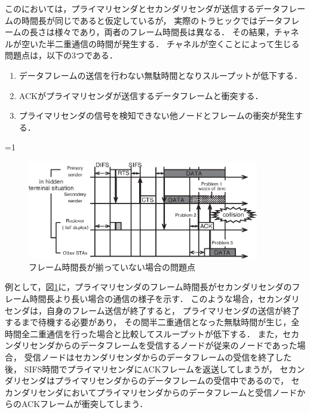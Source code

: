 \documentclass[master]{kuisthesis}		%
\newcounter{flagFig}
\begin{document}
			\par
			この\cite{fdmac}においては，プライマリセンダとセカンダリセンダが送信するデータフレームの時間長が同じであると仮定しているが，
			実際のトラヒックではデータフレームの長さは様々であり，両者のフレーム時間長は異なる．
			その結果，チャネルが空いた半二重通信の時間が発生する．
			チャネルが空くことによって生じる問題点は，以下の3つである．
			\begin{enumerate}
				\item データフレームの送信を行わない無駄時間となりスループットが低下する．
			 	\item ACKがプライマリセンダが送信するデータフレームと衝突する．
			 	\item プライマリセンダの信号を検知できない他ノードとフレームの衝突が発生する．
			\end{enumerate}
			\par
			\ifnum\value{flagFig}=1 {\begin{figure}[htbp]
				\begin{center}
					\includegraphics[width=0.9\textwidth]{fig/relay_not_equal2.eps}
					\caption{フレーム時間長が揃っていない場合の問題点}
					\label{fig:not_equal}
				\end{center}
			\end{figure}}\fi
			例として，図\ref{fig:not_equal}に，プライマリセンダのフレーム時間長がセカンダリセンダのフレーム時間長より長い場合の通信の様子を示す．
			このような場合，セカンダリセンダは，自身のフレーム送信が終了すると，
			プライマリセンダの送信が終了するまで待機する必要があり，
			その間半二重通信となった無駄時間が生じ，全時間全二重通信を行った場合と比較してスループットが低下する．
			また，セカンダリセンダからのデータフレームを受信するノードが従来のノードであった場合，
			受信ノードはセカンダリセンダからのデータフレームの受信を終了した後，
			SIFS時間でプライマリセンダにACKフレームを返送してしまうが，
			セカンダリセンダはプライマリセンダからのデータフレームの受信中であるので，
			セカンダリセンダにおいてプライマリセンダからのデータフレームと受信ノードからのACKフレームが衝突してしまう．
\end{document}
